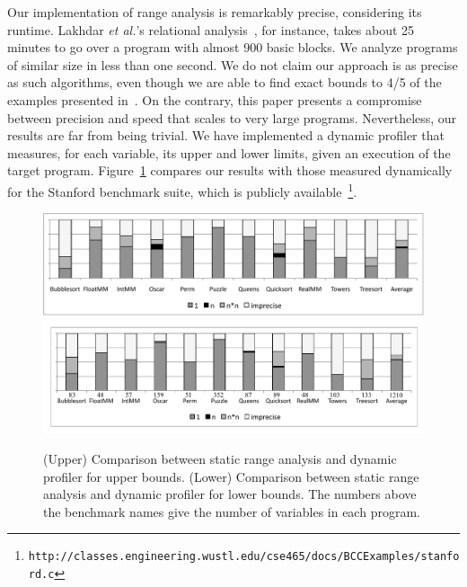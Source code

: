 \documentclass{paper}
\begin{document}
Our implementation of range analysis is remarkably precise, considering its
runtime.
Lakhdar {\em et al.}'s relational analysis~\cite{Lakhdar11}, for instance, takes
about 25 minutes to go over a program with almost 900 basic blocks.
We analyze programs of similar size in less than one second.
We do not claim our approach is as precise as such algorithms, even though we
are able to find exact bounds to 4/5 of the examples presented
in~\cite{Lakhdar11}.
On the contrary, this paper presents a compromise between precision and speed
that scales to very large programs.
Nevertheless, our results are far from being trivial.
We have implemented a dynamic profiler that measures, for each variable,
its upper and lower limits, given an execution of the target program.
Figure~\ref{fig:precision} compares our results with those measured
dynamically for the Stanford benchmark suite, which is publicly
available~\footnote{\texttt{http://classes.engineering.wustl.edu/cse465/docs/BCCExamples/stanford.c}}.

\begin{figure}[t!]
\begin{center}
\includegraphics[width=\textwidth]{images/precUpperBound}
\includegraphics[width=\textwidth]{images/precLowerBound}
\end{center}
\caption{\label{fig:precision}
(Upper) Comparison between static range analysis and dynamic profiler for
upper bounds.
(Lower) Comparison between static range analysis and dynamic profiler for
lower bounds. The numbers above the benchmark names give the number of
variables in each program.}
\end{figure}
\end{document}
